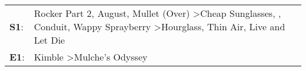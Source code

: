 \begin{supertabular}{p{0.03\textwidth}p{0.92\textwidth}}
 \textbf{S1}:  &  Rocker Part 2\textsuperscript{}, \enspace August\textsuperscript{}, \enspace Mullet (Over)\textsuperscript{} \textgreater \enspace Cheap Sunglasses\textsuperscript{}, \textsuperscript{}, \enspace Conduit\textsuperscript{}, \enspace Wappy Sprayberry\textsuperscript{} \textgreater \enspace Hourglass\textsuperscript{}, \enspace Thin Air\textsuperscript{}, \enspace Live and Let Die\textsuperscript{}  \enspace  \\
 \textbf{E1}:  &                                                                                                                                                                                                                                                                                                                                            Kimble\textsuperscript{} \textgreater \enspace Mulche's Odyssey\textsuperscript{}  \enspace  \\
\end{supertabular}
